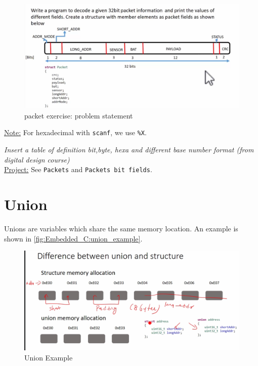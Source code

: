 \begin{figure}[h]
\centering
\includegraphics[scale=0.7]{Figures/Embedded_C/packet_exercise}
\caption{packet exercise: problem statement}
\label{fig:Embedded_C:packet_exercise}
\end{figure}


\underline{Note:} For hexadecimal with \verb|scanf|, we use \verb|%X|.

 \textit{Insert a table of definition bit,byte, hexa and different base number format (from digital design course)}\\

\underline{Project:} See \verb|Packets| and \verb|Packets bit fields|.



\newpage
\section{Union}
\label{Sec:union}

Unions are variables which share the same memory location. An example is shown in \autoref{fig:Embedded_C:union_example}.


\begin{figure}[h]
\centering
\includegraphics[scale=0.7]{Figures/Embedded_C/union_example}
\caption{Union Example}
\label{fig:Embedded_C:union_example}
\end{figure}

